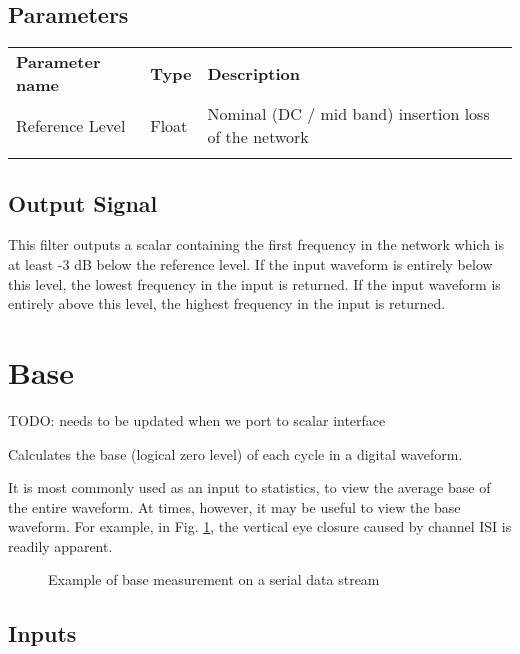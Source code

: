 \subsection{Parameters}

\begin{tabularx}{16cm}{llX}
\thickhline
\textbf{Parameter name} & \textbf{Type} & \textbf{Description} \\
\thickhline
Reference Level & Float & Nominal (DC / mid band) insertion loss of the network\\
\thickhline
\end{tabularx}

\subsection{Output Signal}

This filter outputs a scalar containing the first frequency in the network which is at least -3 dB below the reference
level. If the input waveform is entirely below this level, the lowest frequency in the input is returned. If the
input waveform is entirely above this level, the highest frequency in the input is returned.

\pagebreak
\section{Base}
\label{filter:base}

TODO: needs to be updated when we port to scalar interface

Calculates the base (logical zero level) of each cycle in a digital waveform.

It is most commonly used as an input to statistics, to view the average base of the entire waveform. At times, however,
it may be useful to view the base waveform. For example, in Fig. \ref{filter_base}, the vertical eye closure caused by
channel ISI is readily apparent.

\begin{figure}[h]
\centering
{}
\caption{Example of base measurement on a serial data stream}
\label{filter_base}
\end{figure}

\subsection{Inputs}

